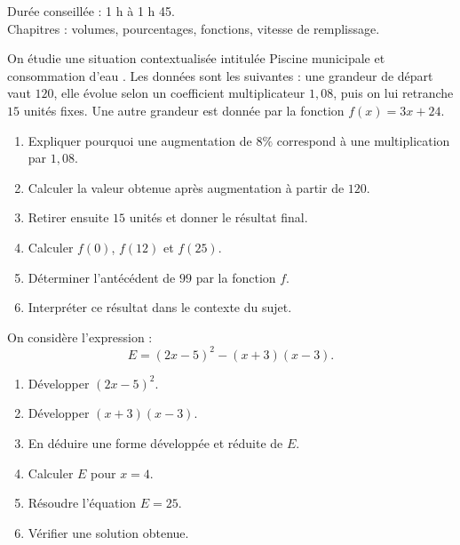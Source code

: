 \documentclass[11pt,a4paper]{article}
\newcounter{exercice}
\begin{document}
\begin{objectif}
Durée conseillée : 1 h à 1 h 45.\\
Chapitres : volumes, pourcentages, fonctions, vitesse de remplissage.
\end{objectif}
\begin{exercice}
On étudie une situation contextualisée intitulée \og Piscine municipale et consommation d'eau \fg. Les données sont les suivantes : une grandeur de départ vaut $120$, elle évolue selon un coefficient multiplicateur $1{,}08$, puis on lui retranche $15$ unités fixes. Une autre grandeur est donnée par la fonction $f(x)=3x+24$.
\begin{enumerate}
  \item Expliquer pourquoi une augmentation de $8\%$ correspond à une multiplication par $1{,}08$.
  \item Calculer la valeur obtenue après augmentation à partir de $120$.
  \item Retirer ensuite $15$ unités et donner le résultat final.
  \item Calculer $f(0)$, $f(12)$ et $f(25)$.
  \item Déterminer l'antécédent de $99$ par la fonction $f$.
  \item Interpréter ce résultat dans le contexte du sujet.
\end{enumerate}
\end{exercice}

\begin{exercice}
On considère l'expression :
\[
E=(2x-5)^2-(x+3)(x-3).
\]
\begin{enumerate}
  \item Développer $(2x-5)^2$.
  \item Développer $(x+3)(x-3)$.
  \item En déduire une forme développée et réduite de $E$.
  \item Calculer $E$ pour $x=4$.
  \item Résoudre l'équation $E=25$.
  \item Vérifier une solution obtenue.
\end{enumerate}
\end{exercice}
\end{document}
